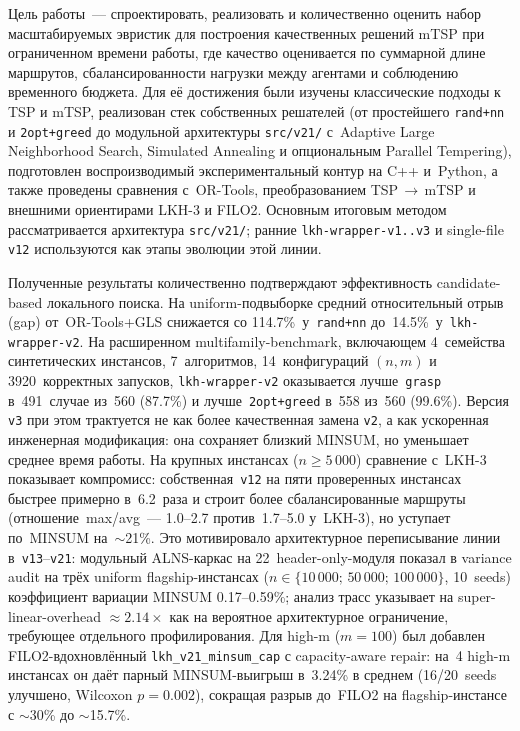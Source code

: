 \documentclass[14pt,a4paper]{extarticle}
\begin{document}
Цель работы~--- спроектировать, реализовать и количественно оценить набор масштабируемых эвристик для построения качественных решений mTSP при ограниченном времени работы, где качество оценивается по суммарной длине маршрутов, сбалансированности нагрузки между агентами и соблюдению временного бюджета. Для её достижения были изучены классические подходы к TSP и mTSP, реализован стек собственных решателей (от простейшего \texttt{rand+nn} и \texttt{2opt+greed} до модульной архитектуры \texttt{src/v21/} с~Adaptive Large Neighborhood Search, Simulated Annealing и опциональным Parallel Tempering), подготовлен воспроизводимый экспериментальный контур на C++ и~Python, а также проведены сравнения с~OR-Tools, преобразованием TSP\,$\rightarrow$\,mTSP и внешними ориентирами LKH-3 и FILO2. Основным итоговым методом рассматривается архитектура \texttt{src/v21/}; ранние \texttt{lkh-wrapper-v1..v3} и single-file \texttt{v12} используются как этапы эволюции этой линии.

Полученные результаты количественно подтверждают эффективность candidate-based локального поиска. На uniform-подвыборке средний относительный отрыв (gap) от~OR-Tools+GLS снижается со 114.7\%~у~\texttt{rand+nn} до~14.5\%~у~\texttt{lkh-wrapper-v2}. На расширенном multifamily-benchmark, включающем 4~семейства синтетических инстансов, 7~алгоритмов, 14~конфигураций $(n,m)$ и 3920~корректных запусков, \texttt{lkh-wrapper-v2} оказывается лучше~\texttt{grasp} в~491~случае из~560 (87.7\%) и лучше~\texttt{2opt+greed} в~558 из~560 (99.6\%). Версия \texttt{v3} при этом трактуется не как более качественная замена \texttt{v2}, а как ускоренная инженерная модификация: она сохраняет близкий MINSUM, но уменьшает среднее время работы. На крупных инстансах ($n \geq 5\,000$) сравнение с~LKH-3 показывает компромисс: собственная~\texttt{v12} на пяти проверенных инстансах быстрее примерно в~6.2~раза и строит более сбалансированные маршруты (отношение~max/avg~--- 1.0--2.7 против~1.7--5.0 у~LKH-3), но уступает по~MINSUM на~$\sim$21\%. Это мотивировало архитектурное переписывание линии в~\texttt{v13}--\texttt{v21}: модульный ALNS-каркас на 22~header-only-модуля показал в variance audit на трёх uniform flagship-инстансах ($n\in\{10\!\,000;\,50\!\,000;\,100\!\,000\}$, 10~seeds) коэффициент вариации MINSUM 0.17--0.59\%; анализ трасс указывает на super-linear-overhead $\approx 2.14\times$ как на вероятное архитектурное ограничение, требующее отдельного профилирования. Для high-m ($m=100$) был добавлен FILO2-вдохновлённый \texttt{lkh\_v21\_minsum\_cap} с capacity-aware repair: на~4 high-m инстансах он даёт парный MINSUM-выигрыш в~3.24\% в среднем (16/20~seeds улучшено, Wilcoxon $p=0.002$), сокращая разрыв до~FILO2 на flagship-инстансе с $\sim$30\% до $\sim$15.7\%.
\end{document}
